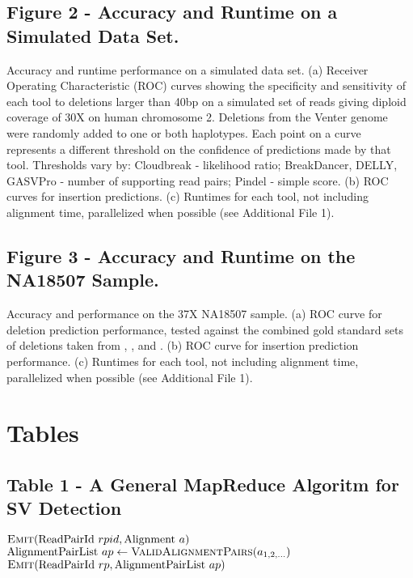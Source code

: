 \documentclass[10pt]{bmc_article}
\newenvironment{bmcformat}{\fussy\setboolean{publ}{true}}{\fussy}
\begin{document}
\begin{bmcformat}
  \subsection*{Figure 2 - Accuracy and Runtime on a Simulated Data Set.}
Accuracy and runtime performance on a simulated data set. (a) Receiver Operating Characteristic (ROC) curves showing the specificity and sensitivity of each tool to deletions larger than 40bp on a simulated set of reads giving diploid coverage of 30X on human chromosome 2. Deletions from the Venter genome were randomly added to one or both haplotypes. Each point on a curve represents a different threshold on the confidence of predictions made by that tool. Thresholds vary by: Cloudbreak - likelihood ratio; BreakDancer, DELLY, GASVPro - number of supporting read pairs; Pindel - simple score. (b) ROC curves for insertion predictions. (c) Runtimes for each tool, not including alignment time, parallelized when possible (see Additional File 1).

\subsection*{Figure 3 - Accuracy and Runtime on the NA18507 Sample.}
Accuracy and performance on the 37X NA18507 sample. (a) ROC curve for deletion prediction performance, tested against the combined gold standard sets of deletions taken from \cite{Kidd:2008p926}, \cite{Mills:2011fi}, and \cite{GenomesProjectConsortium:2012co}. (b) ROC curve for insertion prediction performance. (c) Runtimes for each tool, not including alignment time, parallelized when possible (see Additional File 1). 


\section*{Tables}

  \subsection*{Table 1 - A General MapReduce Algoritm for SV Detection}
\algrenewcommand{}
  \begin{algorithmic}[1]
    \State $\textsc{Emit}(\textrm{ReadPairId }rpid, \textrm{Alignment }a)$
    \EndFor
    \EndFunction
    \State $\textrm{AlignmentPairList }ap \gets \textsc{ValidAlignmentPairs}(a_{1,2,\ldots})$
    \State $\textsc{Emit}(\textrm{ReadPairId }rp, \textrm{AlignmentPairList } ap)$
    \EndFunction
    \EndProcedure


\end{algorithmic}
\end{bmcformat}
\end{document}
